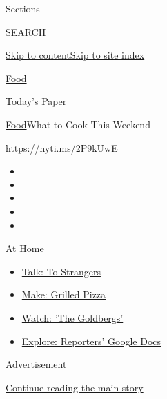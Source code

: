 Sections

SEARCH

\protect\hyperlink{site-content}{Skip to
content}\protect\hyperlink{site-index}{Skip to site index}

\href{https://www.nytimes.com/section/food}{Food}

\href{https://myaccount.nytimes.com/auth/login?response_type=cookie\&client_id=vi}{}

\href{https://www.nytimes.com/section/todayspaper}{Today's Paper}

\href{/section/food}{Food}\textbar{}What to Cook This Weekend

\url{https://nyti.ms/2P9kUwE}

\begin{itemize}
\item
\item
\item
\item
\item
\end{itemize}

\href{https://www.nytimes.com/spotlight/at-home?action=click\&pgtype=Article\&state=default\&region=TOP_BANNER\&context=at_home_menu}{At
Home}

\begin{itemize}
\tightlist
\item
  \href{https://www.nytimes.com/2020/08/03/well/family/the-benefits-of-talking-to-strangers.html?action=click\&pgtype=Article\&state=default\&region=TOP_BANNER\&context=at_home_menu}{Talk:
  To Strangers}
\item
  \href{https://www.nytimes.com/2020/08/01/at-home/coronavirus-make-pizza-on-a-grill.html?action=click\&pgtype=Article\&state=default\&region=TOP_BANNER\&context=at_home_menu}{Make:
  Grilled Pizza}
\item
  \href{https://www.nytimes.com/2020/07/31/arts/television/goldbergs-abc-stream.html?action=click\&pgtype=Article\&state=default\&region=TOP_BANNER\&context=at_home_menu}{Watch:
  'The Goldbergs'}
\item
  \href{https://www.nytimes.com/interactive/2020/at-home/even-more-reporters-editors-diaries-lists-recommendations.html?action=click\&pgtype=Article\&state=default\&region=TOP_BANNER\&context=at_home_menu}{Explore:
  Reporters' Google Docs}
\end{itemize}

Advertisement

\protect\hyperlink{after-top}{Continue reading the main story}

